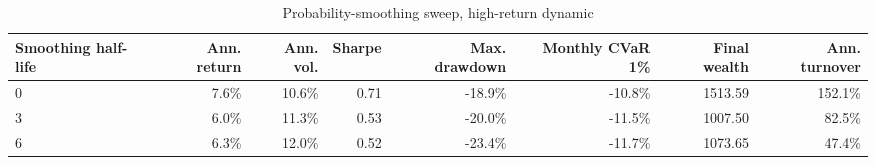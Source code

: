 \begin{table}[!htbp]
\centering
\caption{Probability-smoothing sweep, high-return dynamic}
\label{tab:allocation-smoothing-high-return}
\small
\setlength{\tabcolsep}{5pt}
\renewcommand{\arraystretch}{1.12}
\begin{adjustbox}{center,max width=\linewidth}
\begin{tabular}{lrrrrrrr}
\toprule
Smoothing half-life & Ann. return & Ann. vol. & Sharpe & Max. drawdown & Monthly CVaR 1\% & Final wealth & Ann. turnover \\
\midrule
0 & 7.6\% & 10.6\% & 0.71 & -18.9\% & -10.8\% & 1513.59 & 152.1\% \\
3 & 6.0\% & 11.3\% & 0.53 & -20.0\% & -11.5\% & 1007.50 & 82.5\% \\
6 & 6.3\% & 12.0\% & 0.52 & -23.4\% & -11.7\% & 1073.65 & 47.4\% \\
\bottomrule
\end{tabular}
\end{adjustbox}
\end{table}